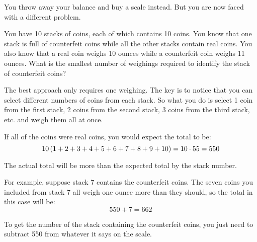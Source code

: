 \documentclass[letterpaper, landscape]{exam}
\begin{document}
\begin{questions}
\begin{solution}
    \end{solution}

    \question

    You throw away your balance and buy a scale instead.  But you are now faced with a different problem.  

    You have 10 stacks of coins, each of which contains 10 coins.  You know that one stack is full of
    counterfeit coins while all the other stacks contain real coins.  You also know that a real coin
    weighs 10 ounces while a counterfeit coin weighs 11 ounces.  What is the smallest number of
    weighings required to identify the stack of counterfeit coins?

    \begin{solution}

      The best approach only requires one weighing.  The key is to notice that you can select
      different numbers of coins from each stack.  So what you do is select 1 coin from the first
      stack, 2 coins from the second stack, 3 coins from the third stack, etc. and weigh them all at
      once.

      If all of the coins were real coins, you would expect the total to be: 
      \[ 
        10 \del{ 1 + 2 + 3 + 4 + 5 + 6 + 7 + 8 + 9 + 10 }  = 10 \cdot 55 = 550 
      \]

      The actual total will be more than the expected total by the stack number.  

      For example, suppose stack 7 contains the counterfeit coins.  The seven coins you included from
      stack 7 all weigh one ounce more than they should, so the total in this case will be: 
      \[ 
        550 + 7 = 662 
      \]

      To get the number of the stack containing the counterfeit coins, you just need to subtract 550
      from whatever it says on the scale.

    \end{solution}

  \end{questions}
\end{document}

